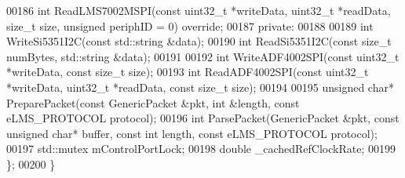 \begin{DoxyCode}
00186     \textcolor{keywordtype}{int} ReadLMS7002MSPI(\textcolor{keyword}{const} uint32\_t *writeData, uint32\_t *readData, \textcolor{keywordtype}{size\_t} size, \textcolor{keywordtype}{unsigned} periphID = 0) \textcolor{keyword}{
      override};
00187 \textcolor{keyword}{private}:
00188 
00189     \textcolor{keywordtype}{int} WriteSi5351I2C(\textcolor{keyword}{const} std::string &data);
00190     \textcolor{keywordtype}{int} ReadSi5351I2C(\textcolor{keyword}{const} \textcolor{keywordtype}{size\_t} numBytes, std::string &data);
00191 
00192     \textcolor{keywordtype}{int} WriteADF4002SPI(\textcolor{keyword}{const} uint32\_t *writeData, \textcolor{keyword}{const} \textcolor{keywordtype}{size\_t} size);
00193     \textcolor{keywordtype}{int} ReadADF4002SPI(\textcolor{keyword}{const} uint32\_t *writeData, uint32\_t *readData, \textcolor{keyword}{const} \textcolor{keywordtype}{size\_t} size);
00194 
00195     \textcolor{keywordtype}{unsigned} \textcolor{keywordtype}{char}* PreparePacket(\textcolor{keyword}{const} GenericPacket &pkt, \textcolor{keywordtype}{int} &length, \textcolor{keyword}{const} 
      eLMS_PROTOCOL protocol);
00196     \textcolor{keywordtype}{int} ParsePacket(GenericPacket &pkt, \textcolor{keyword}{const} \textcolor{keywordtype}{unsigned} \textcolor{keywordtype}{char}* buffer, \textcolor{keyword}{const} \textcolor{keywordtype}{int} 
      length, \textcolor{keyword}{const} eLMS_PROTOCOL protocol);
00197     std::mutex mControlPortLock;
00198     \textcolor{keywordtype}{double} _cachedRefClockRate;
00199 \};
00200 \}
\end{DoxyCode}
